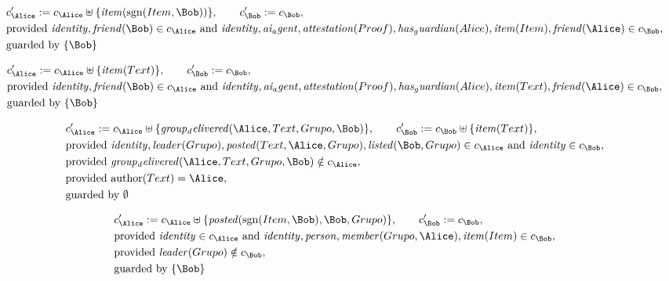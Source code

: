 \begin{align*}
&
c'_
{
\Alice
}
 := 
c_
{
\Alice
}
 \uplus 
\{
\mathit{
item
}
(
\mathrm{sgn}(
Item
,
\Bob
)
)
\}
, \qquad 
c'_
{
\Bob
}
 := 
c_
{
\Bob
}
,\\
&
\text{provided } 
\mathit{
identity
}
,
\mathit{
friend
}
(
\Bob
)
 \in c_
{
\Alice
}
 \text{ and } 
\mathit{
identity
}
,
\mathit{
ai_agent
}
,
\mathit{
attestation
}
(
Proof
)
,
\mathit{
has_guardian
}
(
Alice
)
,
\mathit{
item
}
(
Item
)
,
\mathit{
friend
}
(
\Alice
)
 \in c_
{
\Bob
}
,\\
&
\text{guarded by } \{
\Bob
\}
\end{align*}

\begin{align*}
&
c'_
{
\Alice
}
 := 
c_
{
\Alice
}
 \uplus 
\{
\mathit{
item
}
(
Text
)
\}
, \qquad 
c'_
{
\Bob
}
 := 
c_
{
\Bob
}
,\\
&
\text{provided } 
\mathit{
identity
}
,
\mathit{
friend
}
(
\Bob
)
 \in c_
{
\Alice
}
 \text{ and } 
\mathit{
identity
}
,
\mathit{
ai_agent
}
,
\mathit{
attestation
}
(
Proof
)
,
\mathit{
has_guardian
}
(
Alice
)
,
\mathit{
item
}
(
Text
)
,
\mathit{
friend
}
(
\Alice
)
 \in c_
{
\Bob
}
,\\
&
\text{guarded by } \{
\Bob
\}
\end{align*}

\begin{align*}
&
c'_
{
\Alice
}
 := 
c_
{
\Alice
}
 \uplus 
\{
\mathit{
group_delivered
}
(
\Alice
,
Text
,
Grupo
,
\Bob
)
\}
, \qquad 
c'_
{
\Bob
}
 := 
c_
{
\Bob
}
 \uplus 
\{
\mathit{
item
}
(
Text
)
\}
,\\
&
\text{provided } 
\mathit{
identity
}
,
\mathit{
leader
}
(
Grupo
)
,
\mathit{
posted
}
(
Text
,
\Alice
,
Grupo
)
,
\mathit{
listed
}
(
\Bob
,
Grupo
)
 \in c_
{
\Alice
}
 \text{ and } 
\mathit{
identity
}
 \in c_
{
\Bob
}
,\\
&
\text{provided } 
\mathit{
group_delivered
}
(
\Alice
,
Text
,
Grupo
,
\Bob
)
 \notin c_
{
\Alice
}
,\\
&
\text{provided } 
\mathrm{author}(
Text
)
=
\Alice
,\\
&
\text{guarded by } \emptyset
\end{align*}

\begin{align*}
&
c'_
{
\Alice
}
 := 
c_
{
\Alice
}
 \uplus 
\{
\mathit{
posted
}
(
\mathrm{sgn}(
Item
,
\Bob
)
,
\Bob
,
Grupo
)
\}
, \qquad 
c'_
{
\Bob
}
 := 
c_
{
\Bob
}
,\\
&
\text{provided } 
\mathit{
identity
}
 \in c_
{
\Alice
}
 \text{ and } 
\mathit{
identity
}
,
\mathit{
person
}
,
\mathit{
member
}
(
Grupo
,
\Alice
)
,
\mathit{
item
}
(
Item
)
 \in c_
{
\Bob
}
,\\
&
\text{provided } 
\mathit{
leader
}
(
Grupo
)
 \notin c_
{
\Bob
}
,\\
&
\text{guarded by } \{
\Bob
\}
\end{align*}
